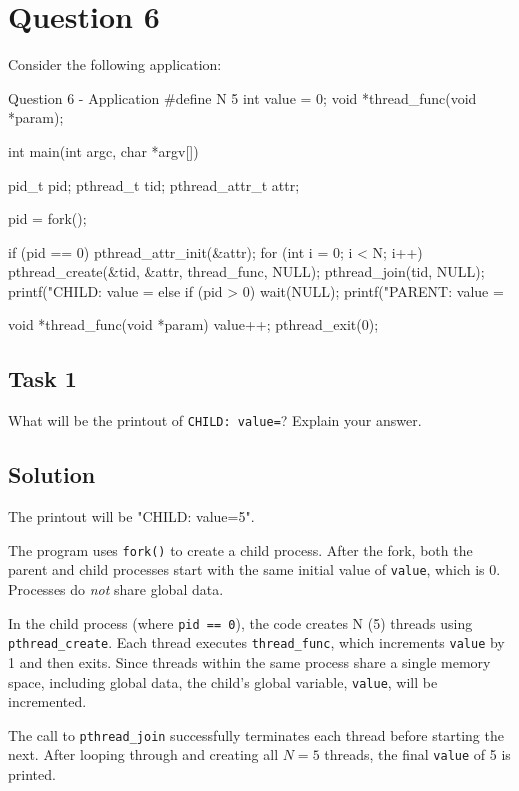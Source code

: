 \documentclass[../main.tex]{subfiles}
\begin{document}
\newpage
\section{Question 6}

Consider the following application:

\begin{cppminted}{Question 6 - Application}
#define N 5
int value = 0;
void *thread_func(void *param);

int main(int argc, char *argv[]) {
    pid_t pid;
    pthread_t tid;
    pthread_attr_t attr;

    pid = fork();

    if (pid == 0) {
        pthread_attr_init(&attr);
        for (int i = 0; i < N; i++) {
            pthread_create(&tid, &attr, thread_func, NULL);
            pthread_join(tid, NULL);
        }
        printf("CHILD: value = %
    }
    else if (pid > 0) {
        wait(NULL);
        printf("PARENT: value = %
    }
}

void *thread_func(void *param) {
    value++;
    pthread_exit(0);
}
\end{cppminted}

\subsection{Task 1}

What will be the printout of \lstinline{CHILD: value=}? Explain your answer.

\subsection*{Solution}

The printout will be "CHILD: value=5".

The program uses \lstinline{fork()} to create a child process. After the fork, both the parent and child processes start with the same initial value of \lstinline{value}, which is 0. Processes do \textit{not} share global data.

In the child process (where \lstinline{pid == 0}), the code creates N (5) threads using \lstinline{pthread_create}. Each thread executes \lstinline{thread_func}, which increments \lstinline{value} by 1 and then exits. Since threads within the same process share a single memory space, including global data, the child's global variable, \lstinline{value}, will be incremented.

The call to \lstinline{pthread_join} successfully terminates each thread before starting the next. After looping through and creating all $N = 5$ threads, the final \lstinline{value} of 5 is printed.
\end{document}

